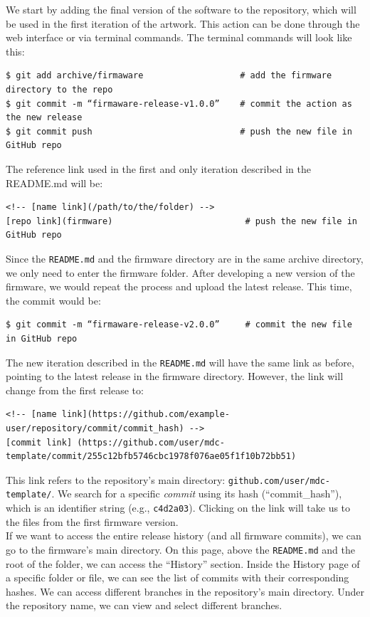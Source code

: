 We start by adding the final version of the software to the repository, which will be used in the first iteration of the artwork. This action can be done through the web interface or via terminal commands. The terminal commands will look like this:
\begin{lstlisting}[style=bash]
$ git add archive/firmaware                   # add the firmware directory to the repo
$ git commit -m “firmaware-release-v1.0.0”    # commit the action as the new release
$ git commit push                             # push the new file in GitHub repo
\end{lstlisting}
The reference link used in the first and only iteration described in the README.md will be:
\begin{lstlisting}[style=markdown]
<!-- [name link](/path/to/the/folder) -->
[repo link](firmware)                          # push the new file in GitHub repo
\end{lstlisting}
Since the \texttt{README.md} and the firmware directory are in the same archive directory, we only need to enter the firmware folder. After developing a new version of the firmware, we would repeat the process and upload the latest release. This time, the commit would be:
\begin{lstlisting}[style=bash]
$ git commit -m “firmaware-release-v2.0.0”     # commit the new file in GitHub repo
\end{lstlisting}
The new iteration described in the \texttt{README.md} will have the same link as before, pointing to the latest release in the firmware directory. However, the link will change from the first release to:
\begin{lstlisting}[style=markdown]
<!-- [name link](https://github.com/example-user/repository/commit/commit_hash) -->
[commit link] (https://github.com/user/mdc-template/commit/255c12bfb5746cbc1978f076ae05f1f10b72bb51)
\end{lstlisting}
This link refers to the repository's main directory: \texttt{github.com/user/mdc-template/}. We search for a specific \textit{commit} using its hash (``commit\_hash''), which is an identifier string (e.g., \texttt{c4d2a03}). Clicking on the link will take us to the files from the first firmware version.\\
If we want to access the entire release history (and all firmware commits), we can go to the firmware’s main directory. On this page, above the \texttt{README.md} and the root of the folder, we can access the ``History'' section. Inside the History page of a specific folder or file, we can see the list of commits with their corresponding hashes. We can access different branches in the repository's main directory. Under the repository name, we can view and select different branches.\\
